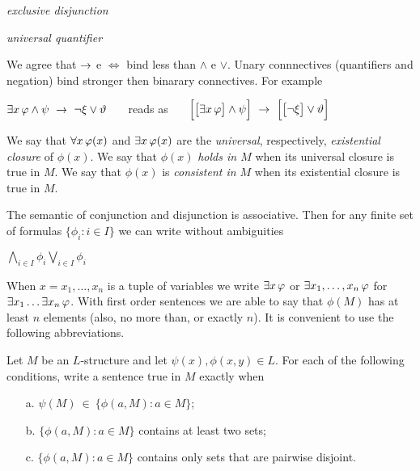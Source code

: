\emph{exclusive disjunction}

\emph{universal quantifier}\bigskip

We agree that $\rightarrow$ e $\iff$ bind less than $\wedge$ e $\vee$.  Unary connnectives (quantifiers and negation) bind stronger then binarary connectives. For example

\hfil$\E x\,\phi \wedge \psi\ \imp\ \neg\xi\vee\theta$ \ \ \ reads as \ \ \ $\Big[\big[\E x\,\phi\big]\wedge\psi\Big]\ \imp\ \Big[\big[\neg\xi\big]\vee\theta\Big]$

We say that $\forall x\,\varphi(x)$ and $\exists x\,\varphi(x)$ are the \emph{universal}, respectively, \emph{existential closure} of $\phi(x)$. We say that $\phi(x)$ \emph{holds in $M$\/} when its universal closure is true in $M$. We say that $\phi(x)$ is \emph{consistent in $M$\/} when its existential closure is true in $M$.

The semantic of conjunction and disjunction is associative. Then for any finite set of formulas $\{\phi_i:i\in I\}$ we can write without ambiguities 

\hfil \emph{$\displaystyle\bigwedge_{i\in I}\phi_i$}\hfil \emph{$\displaystyle\bigvee_{i\in I}\phi_i$}\bigskip


When $x=x_1,\dots,x_n$ is a tuple of variables we write \emph{$\exists x\,\varphi$\/} or \emph{$\exists x_1,\dots,x_n\,\varphi$\/} for $\exists x_1\dots\exists x_n\,\varphi$.  With first order sentences we are able to say that $\phi(M)$ has at least $n$ elements (also, no more than, or exactly $n$). It is convenient to use the following abbreviations.


\bigskip

\smallskip


\begin{exercise}
Let $M$ be an $L$-structure and let $\psi(x), \phi(x,y)\in L$. For each of the following conditions, write a sentence true in $M$ exactly when
\begin{itemize}
\item[a.] $\psi(M)\ \in\ \big\{\phi(a,M): a\in M\big\}$;
\item[b.] $\big\{\phi(a,M): a\in M\big\}$ contains at least two sets;
\item[c.] $\big\{\phi(a,M): a\in M\big\}$ contains only sets that are pairwise disjoint.\QED
\end{itemize}
\end{exercise}

